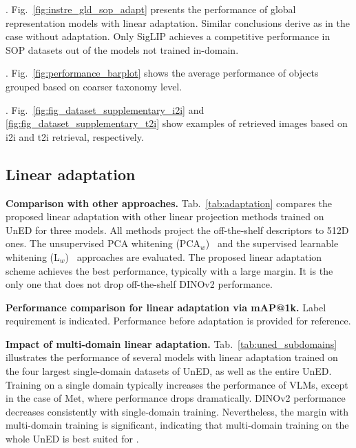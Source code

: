 . Fig.~\ref{fig:instre_gld_sop_adapt} presents the performance of global representation models with linear adaptation. Similar conclusions derive as in the case without adaptation. Only SigLIP achieves a competitive performance in SOP datasets out of the models not trained in-domain.

. Fig.~\ref{fig:performance_barplot} shows the average performance of objects grouped based on coarser taxonomy level.

. Fig.~\ref{fig:fig_dataset_supplementary_i2i} and \ref{fig:fig_dataset_supplementary_t2i} show examples of retrieved images based on i2i and t2i retrieval, respectively.


\subsection{Linear adaptation}

\noindent\textbf{Comparison with other approaches.}
Tab.~\ref{tab:adaptation} compares the proposed linear adaptation with other linear projection methods trained on UnED for three models. 
All methods project the off-the-shelf descriptors to 512D ones.
The unsupervised PCA whitening (PCA$_w$)~\cite{jc12} and the supervised learnable whitening (L$_w$)~\cite{rtc19} approaches are evaluated. 
The proposed linear adaptation scheme achieves the best performance, typically with a large margin. It is the only one that does not drop off-the-shelf DINOv2 performance.

\begin{table}[t]
  \centering
  
  \vspace{-5pt}
  \caption{\textbf{Performance comparison for linear adaptation via mAP@1k.} Label requirement is indicated. Performance before adaptation is provided for reference.
  \vspace{-0pt}
  \label{tab:adaptation}}
\end{table}

\noindent\textbf{Impact of multi-domain linear adaptation.}
Tab.~\ref{tab:uned_subdomains} illustrates the performance of several models with linear adaptation trained on the four largest single-domain datasets of UnED, as well as the entire UnED. Training on a single domain typically increases the performance of VLMs, except in the case of Met, where performance drops dramatically. DINOv2 performance decreases consistently with single-domain training. Nevertheless, the margin with multi-domain training is significant, indicating that multi-domain training on the whole UnED is best suited for \ours.

